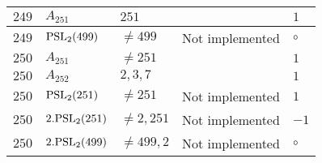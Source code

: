 \documentclass[a4paper, 11pt]{article}
\begin{document}
\begin{longtable}{lllll}
        $ 249 $ & $ A_{251} $ & $ 251 $ & $ ~ $ & $ 1  $ \\ \hline
        $ 249 $ & $ {\rm PSL}_{2}(499) $ & $ \neq 499 $ & Not implemented & $\circ$ \\ \hline
        $ 250 $ & $ A_{251} $ & $ \neq 251 $ & $ ~ $ & $ 1  $ \\ \hline
        $ 250 $ & $ A_{252} $ & $ 2, 3, 7 $ & $ ~ $ & $ 1  $ \\ \hline
        $ 250 $ & $ {\rm PSL}_{2}(251) $ & $ \neq 251 $ & Not implemented & $ 1  $ \\ \hline
        $ 250 $ & $ 2.{\rm PSL}_{2}(251) $ & $ \neq 2, 251 $ & Not implemented & $ -1  $ \\ \hline
        $ 250 $ & $ 2.{\rm PSL}_{2}(499) $ & $ \neq 499, 2 $ & Not implemented & $\circ$ \\ \hline
	\end{longtable}
\end{document}
